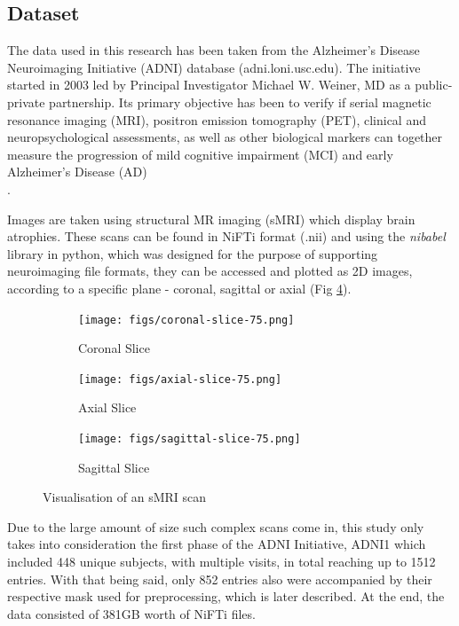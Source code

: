 \documentclass[a4paper, 12pt]{article}
\begin{document}
\newpage
\subsection{Dataset}
The data used in this research has been taken from the Alzheimer's Disease Neuroimaging Initiative (ADNI)
database (adni.loni.usc.edu). The initiative started in 2003 led by Principal Investigator Michael W. Weiner, MD
as a public-private partnership. Its primary objective has been to verify if serial magnetic resonance imaging (MRI),
positron emission tomography (PET), clinical and neuropsychological assessments, as well as other biological markers
can together measure the progression of mild cognitive impairment (MCI) and early Alzheimer's Disease (AD)\\
\cite{PMID20042704}.


Images are taken using structural MR imaging (sMRI) which display brain atrophies. These scans can be found in
NiFTi format (.nii) and using the \textit{nibabel} library in python, which was designed for the purpose of
supporting neuroimaging file formats, they can be accessed and plotted as 2D images, according to a specific
plane - coronal, sagittal or axial (Fig \ref{fig:images}).

\begin{figure}[htbp]
    \centering
    \begin{subfigure}[b]{0.3\textwidth}
        \centering
        \texttt{[image: figs/coronal-slice-75.png]}
        \caption{Coronal Slice}
        \label{fig:sub1}
    \end{subfigure}
    \begin{subfigure}[b]{0.3\textwidth}
        \centering
        \texttt{[image: figs/axial-slice-75.png]}
        \caption{Axial Slice}
        \label{fig:sub2}
    \end{subfigure}
    \begin{subfigure}[b]{0.3\textwidth}
        \centering
        \texttt{[image: figs/sagittal-slice-75.png]}
        \caption{Sagittal Slice}
        \label{fig:sub3}
    \end{subfigure}
    \caption{Visualisation of an sMRI scan}
    \label{fig:images}
\end{figure}

Due to the large amount of size such complex scans come in, this study only takes into consideration the first phase of the
ADNI Initiative, ADNI1 which included 448 unique subjects, with multiple visits, in total reaching up to 1512 entries.
With that being said, only 852 entries also were accompanied by their respective mask used for preprocessing, which is later
described. At the end, the data consisted of 381GB worth of NiFTi files.
\end{document}
